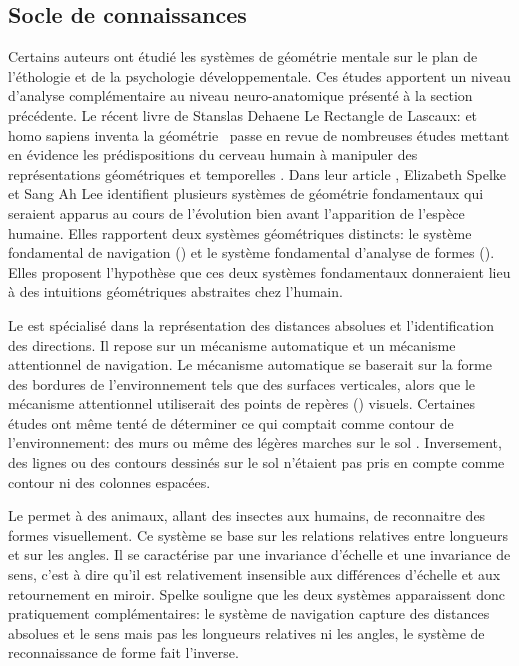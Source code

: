 \subsection{Socle de connaissances}
\label{sec:core}

\noindent
Certains auteurs ont étudié les systèmes de géométrie mentale sur le plan de l'éthologie et de la psychologie développementale. 
Ces études apportent un niveau d'analyse complémentaire au niveau neuro-anatomique présenté à la section précédente. 
Le récent livre de Stanslas Dehaene \og Le Rectangle de Lascaux: et homo sapiens inventa la géométrie \fg\ passe en revue de nombreuses études mettant en évidence les prédispositions du cerveau humain à manipuler des représentations géométriques et temporelles \cite{dehaene_rectangle_2026}.  
Dans leur article \og {} \fg, Elizabeth Spelke et Sang Ah Lee identifient plusieurs systèmes de géométrie fondamentaux qui seraient apparus au cours de l'évolution bien avant l'apparition de l'espèce humaine. 
Elles rapportent deux systèmes géométriques distincts: le système fondamental de navigation () et le système fondamental d'analyse de formes ().  
Elles proposent l'hypothèse que ces deux systèmes fondamentaux donneraient lieu à des intuitions géométriques abstraites chez l'humain. 

Le  est spécialisé dans la représentation des distances absolues et l'identification des directions.
Il repose sur un mécanisme automatique et un mécanisme attentionnel de navigation. 
Le mécanisme automatique se baserait sur la forme des bordures de l'environnement tels que des surfaces verticales, alors que le mécanisme attentionnel utiliserait des points de repères () visuels. 
Certaines études ont même tenté de déterminer ce qui comptait comme contour de l'environnement: des murs ou même des légères marches sur le sol \cite{cheng_purely_1986}. 
Inversement, des lignes ou des contours dessinés sur le sol n'étaient pas pris en compte comme contour ni des colonnes espacées.  
 

Le  permet à des animaux, allant des insectes aux humains, de  reconnaitre des formes visuellement. 
Ce système se base sur les relations relatives entre longueurs et sur les angles. Il se caractérise par une invariance d'échelle et une invariance de sens, c'est à dire qu'il est relativement insensible aux différences d'échelle et aux retournement en miroir.
Spelke souligne que les deux systèmes apparaissent donc pratiquement complémentaires: le système de navigation capture des distances absolues et le sens mais pas les longueurs relatives ni les angles, le système de reconnaissance de forme fait l'inverse. 

